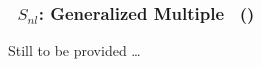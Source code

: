 \vsssub
\subsubsection{~$S_{nl}$: Generalized Multiple \dia\  (\gmd)} \label{sec:NL3}
\vsssub


\noindent
Still to be provided \ldots
